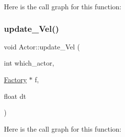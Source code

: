 Here is the call graph for this function\+:
\mbox{\label{namespace_actor_a820206ab30a4a0fb3f37d78669598fdb}} 
\subsubsection{\texorpdfstring{update\+\_\+\+Vel()}{update\_Vel()}}
{\footnotesize\ttfamily void Actor\+::update\+\_\+\+Vel (\begin{DoxyParamCaption}\item[{int}]{which\+\_\+actor,  }\item[{\mbox{\hyperlink{struct_actor_1_1_factory}{Factory}} $\ast$}]{f,  }\item[{float}]{dt }\end{DoxyParamCaption})}

Here is the call graph for this function\+:
